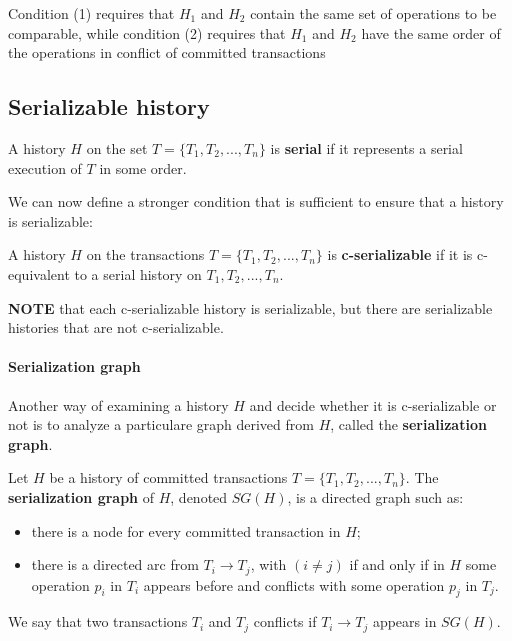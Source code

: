 Condition (1) requires that $H_1$ and $H_2$ contain the same set of operations to be comparable, while condition (2) requires that $H_1$ and $H_2$ have the same order of the operations in conflict of committed transactions

\subsection{Serializable history}
A history $H$ on the set $T = \{ T_1, T_2, ..., T_n \}$ is \textbf{serial} if it represents a serial execution of $T$ in some order. 

We can now define a stronger condition that is sufficient to ensure that a history is serializable:

\begin{tcolorbox}
    A history $H$ on the transactions $T = \{T_1, T_2, ..., T_n\}$ is \textbf{c-serializable} if it is c-equivalent to a serial history on $T_1, T_2, ..., T_n$.
\end{tcolorbox}

\textbf{NOTE} that each c-serializable history is serializable, but there are serializable histories that are not c-serializable.

\paragraph{Serialization graph}
Another way of examining a history $H$ and decide whether it is c-serializable or not is to analyze a particulare graph derived from $H$, called the \textbf{serialization graph}.

\begin{tcolorbox}
    Let $H$ be a history of committed transactions $T = \{T_1, T_2, ..., T_n\}$. The \textbf{serialization graph} of $H$, denoted $SG(H)$, is a directed graph such as:
    \begin{itemize}
        \item there is a node for every committed transaction in $H$;
        \item there is a directed arc from $T_i \rightarrow T_j$, with $(i \neq j)$ if and only if in $H$ some operation $p_i$ in $T_i$ appears before and conflicts with some operation $p_j$ in $T_j$.
    \end{itemize}

\end{tcolorbox}

We say that two transactions $T_i$ and $T_j$ conflicts if $T_i \rightarrow T_j$ appears in $SG(H)$.

